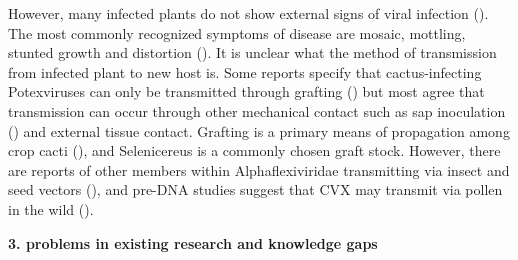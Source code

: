 \documentclass{article}
\begin{document}
However, many infected plants do not show external signs of viral infection (\cite{liou_complete_2004, bos_symptoms_1977}). 
The most commonly recognized symptoms of disease are mosaic, mottling, stunted growth and distortion (\cite{maliarenko_cactus_2013, peng_molecular_2016, attathom_occurrence_1978}). 
It is unclear what the method of transmission from infected plant to new host is. 
Some reports specify that cactus-infecting Potexviruses can only be transmitted through grafting (\cite{duarte_potexvirus_2008, martelli_family_2007}) but most agree that transmission can occur through other mechanical contact such as sap inoculation (\cite{liou_complete_2004, maliarenko_cactus_2013, park_detection_2018}) and external tissue contact. 
Grafting is a primary means of propagation among crop cacti (\cite{park_detection_2018}), and Selenicereus is a commonly chosen graft stock. 
However, there are reports of other members within Alphaflexiviridae transmitting via insect and seed vectors (\cite{martelli_family_2007}), and pre-DNA studies suggest that CVX may transmit via pollen in the wild (\cite{attathom_occurrence_1978}).

    
\textbf{3. problems in existing research and knowledge gaps}

\end{document}
